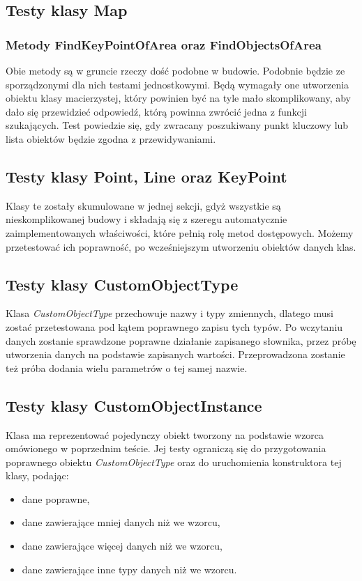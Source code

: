 \documentclass[a4paper,11pt]{article}
\newcommand\tab[1][0.6cm]{\hspace*{#1}}
\begin{document}
\subsection{Testy klasy Map}

\subsubsection{Metody FindKeyPointOfArea oraz FindObjectsOfArea}

\tab Obie metody są w gruncie rzeczy dość podobne w budowie. Podobnie będzie ze sporządzonymi dla nich testami jednostkowymi. Będą wymagały one utworzenia obiektu klasy macierzystej, który powinien być na tyle mało skomplikowany, aby dało się przewidzieć odpowiedź, którą powinna zwrócić jedna z funkcji szukających. Test powiedzie się, gdy zwracany poszukiwany punkt kluczowy lub lista obiektów będzie zgodna z przewidywaniami.

\subsection{Testy klasy Point, Line oraz KeyPoint}

\tab Klasy te zostały skumulowane w jednej sekcji, gdyż wszystkie są nieskomplikowanej budowy i składają się z szeregu automatycznie zaimplementowanych właściwości, które pełnią rolę metod dostępowych. Możemy przetestować ich poprawność, po wcześniejszym utworzeniu obiektów danych klas.

\subsection{Testy klasy CustomObjectType}

\tab Klasa \textit{CustomObjectType} przechowuje nazwy i typy zmiennych, dlatego musi zostać przetestowana pod kątem poprawnego zapisu tych typów. 
Po wczytaniu danych zostanie sprawdzone poprawne działanie zapisanego słownika, przez próbę utworzenia danych na podstawie zapisanych wartości. Przeprowadzona zostanie też próba dodania wielu parametrów o tej samej nazwie.

\subsection{Testy klasy CustomObjectInstance}

\tab Klasa ma reprezentować pojedynczy obiekt tworzony na podstawie wzorca omówionego w poprzednim teście. Jej testy ograniczą się do przygotowania poprawnego obiektu \textit{CustomObjectType} oraz do uruchomienia konstruktora tej klasy, podając:

\begin{itemize}
\item dane poprawne,
\item dane zawierające mniej danych niż we wzorcu,
\item dane zawierające więcej danych niż we wzorcu,
\item dane zawierające inne typy danych niż we wzorcu.
\end{itemize}
\end{document}
